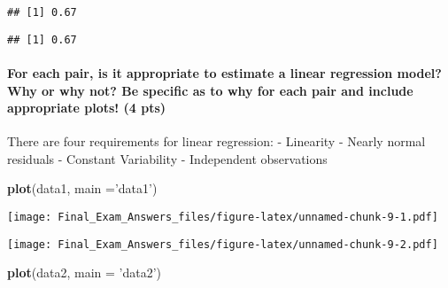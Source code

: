 \documentclass[]{article}
\newenvironment{Shaded}{\begin{snugshade}}{\end{snugshade}}
\newcommand{\KeywordTok}[1]{\textcolor[rgb]{0.13,0.29,0.53}{\textbf{#1}}}
\newcommand{\DataTypeTok}[1]{\textcolor[rgb]{0.13,0.29,0.53}{#1}}
\newcommand{\DecValTok}[1]{\textcolor[rgb]{0.00,0.00,0.81}{#1}}
\newcommand{\StringTok}[1]{\textcolor[rgb]{0.31,0.60,0.02}{#1}}
\newcommand{\OperatorTok}[1]{\textcolor[rgb]{0.81,0.36,0.00}{\textbf{#1}}}
\newcommand{\NormalTok}[1]{#1}
\let\oldparagraph\paragraph
\renewcommand{\paragraph}[1]{\oldparagraph{#1}\mbox{}}
\begin{document}
\begin{verbatim}
## [1] 0.67
\end{verbatim}

\begin{Shaded}
\end{Shaded}

\begin{verbatim}
## [1] 0.67
\end{verbatim}

\paragraph{For each pair, is it appropriate to estimate a linear
regression model? Why or why not? Be specific as to why for each pair
and include appropriate plots! (4
pts)}\label{for-each-pair-is-it-appropriate-to-estimate-a-linear-regression-model-why-or-why-not-be-specific-as-to-why-for-each-pair-and-include-appropriate-plots-4-pts}

There are four requirements for linear regression: - Linearity - Nearly
normal residuals - Constant Variability - Independent observations

\begin{Shaded}
\begin{Highlighting}[]
\KeywordTok{plot}\NormalTok{(data1, }\DataTypeTok{main =}\StringTok{'data1'}\NormalTok{)}
\end{Highlighting}
\end{Shaded}

\texttt{[image: Final\_Exam\_Answers\_files/figure-latex/unnamed-chunk-9-1.pdf]}

\begin{Shaded}
\end{Shaded}

\texttt{[image: Final\_Exam\_Answers\_files/figure-latex/unnamed-chunk-9-2.pdf]}

\begin{Shaded}
\begin{Highlighting}[]
\KeywordTok{plot}\NormalTok{(data2, }\DataTypeTok{main =} \StringTok{'data2'}\NormalTok{)}
\end{Highlighting}
\end{Shaded}
\end{document}
